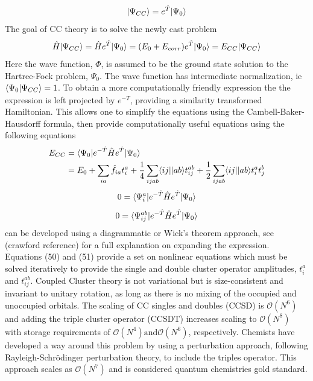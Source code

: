         \begin{equation}
          | \Psi_{CC} \rangle = e^{\hat{T}}| \Psi_0 \rangle
        \end{equation}
      The goal of CC theory is to solve the newly cast problem
        \begin{equation}
          \hat{H}| \Psi_{CC} \rangle = \hat{H} e^{\hat{T}} | \Psi_0 \rangle = (E_0 + E_{corr}) e^{\hat{T}} | \Psi_0 \rangle = E_{CC} | \Psi_{CC} \rangle
        \end{equation}
      Here the wave function, $\Phi$, is assumed to be the ground state solution to the Hartree-Fock problem, $\Psi_0$. The wave function has intermediate normalization, ie $\langle\Psi_0|\Psi_{CC}\rangle = 1$. To obtain a more computationally friendly expression the the expression is left projected by $e^{-\hat{T}}$, providing a similarity transformed Hamiltonian.  This allows one to simplify the equations using the Cambell-Baker-Hausdorff formula\cite{Crawford 2000}, then provide computationally useful equations using the following equations 
        \begin{equation}
          \begin{aligned}
            E_{CC} &= \langle\Psi_0 |e^{-\hat{T}} \hat{H} e^{\hat{T}} | \Psi_0 \rangle \\
            &= E_0 + \sum_{ia} \hat{f}_{ia}t^a_i + \frac{1}{4} \sum_{ijab} \langle ij || ab \rangle t^{ab}_{ij} + \frac{1}{2} \sum_{ijab} \langle ij || ab \rangle t^a_i t^b_j
          \end{aligned}
        \end{equation}
        \begin{equation}
          0 = \langle\Psi^a_i | e^{-\hat{T}} \hat{H} e^{\hat{T}} | \Psi_0 \rangle
        \end{equation}
        \begin{equation}
          0 = \langle\Psi^{ab}_{ij} | e^{-\hat{T}} \hat{H} e^{\hat{T}} | \Psi_0 \rangle
        \end{equation}
      can be developed using a diagrammatic or Wick's theorem approach, see (crawford reference) for a full explanation on expanding the expression.  Equations (50) and (51) provide a set on nonlinear equations which must be solved iteratively to provide the single and double cluster operator amplitudes, $t^a_i$ and $t^{ab}_{ij}$.
      Coupled Cluster theory is not variational but is size-consistent and invariant to unitary rotation, as long as there is no mixing of the occupied and unoccupied orbitals.  The scaling of CC singles and doubles (CCSD) is $\mathcal{O}(N^6)$ and adding the triple cluster operator (CCSDT) increases scaling to $\mathcal{O}(N^8)$\cite{Noga 1987, Scuseria 1988} with storage requirements of $\mathcal{O}(N^4) \text {and} \mathcal{O}(N^6)$, respectively. Chemists have developed a way around this problem by using a perturbation approach, following Rayleigh-Schr{\"o}dinger perturbation theory, to include the triples operator\cite{Crawford 2000}.  This approach scales as $\mathcal{O}(N^7)$ and is considered quantum chemistries gold standard.

